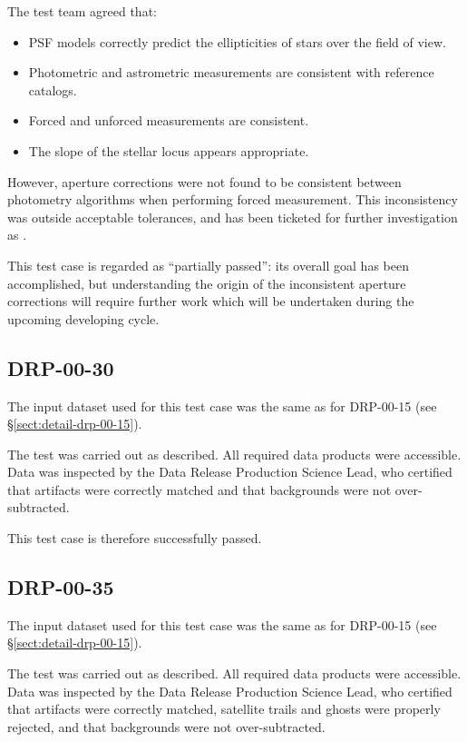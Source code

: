 \documentclass[DM,STR,toc]{lsstdoc}
\begin{document}
The test team agreed that:

\begin{itemize}

  \item{PSF models correctly predict the ellipticities of stars over the field of view.}
  \item{Photometric and astrometric measurements are consistent with reference catalogs.}
  \item{Forced and unforced measurements are consistent.}
  \item{The slope of the stellar locus appears appropriate.}

\end{itemize}

However, aperture corrections were not found to be consistent between photometry algorithms when performing forced measurement.
This inconsistency was outside acceptable tolerances, and has been ticketed for further investigation as .

This test case is regarded as ``partially passed'': its overall goal has been accomplished, but understanding the origin of the inconsistent aperture corrections will require further work which will be undertaken during the upcoming developing cycle.

\subsection{DRP-00-30}
\label{sect:detail-drp-00-30}

The input dataset used for this test case was the same as for DRP-00-15 (see \S\ref{sect:detail-drp-00-15}).

The test was carried out as described.
All required data products were accessible.
Data was inspected by the Data Release Production Science Lead, who certified that artifacts were correctly matched and that backgrounds were not over-subtracted.

This test case is therefore successfully passed.

\subsection{DRP-00-35}
\label{sect:detail-drp-00-35}

The input dataset used for this test case was the same as for DRP-00-15 (see \S\ref{sect:detail-drp-00-15}).

The test was carried out as described.
All required data products were accessible.
Data was inspected by the Data Release Production Science Lead, who certified that artifacts were correctly matched, satellite trails and ghosts were properly rejected, and that backgrounds were not over-subtracted.
\end{document}
